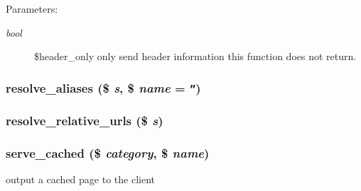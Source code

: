 \begin{Desc}
\item[Parameters:]
\begin{description}
\item[{\em bool}]\$header\_\-only only send header information this function does not return. \end{description}
\end{Desc}
\hypertarget{common_8inc_8php_78992fdfae6cd9d7d4e8053d004d1709}{
\subsubsection[{resolve\_\-aliases}]{\setlength{\rightskip}{0pt plus 5cm}resolve\_\-aliases (\$ {\em s}, \/  \$ {\em name} = {\tt ''})}}
\label{common_8inc_8php_78992fdfae6cd9d7d4e8053d004d1709}


\hypertarget{common_8inc_8php_81eb70073067db81ab43829870f15e6d}{
\subsubsection[{resolve\_\-relative\_\-urls}]{\setlength{\rightskip}{0pt plus 5cm}resolve\_\-relative\_\-urls (\$ {\em s})}}
\label{common_8inc_8php_81eb70073067db81ab43829870f15e6d}


\hypertarget{common_8inc_8php_ac90387dcab722e243df2d083f8d6a00}{
\subsubsection[{serve\_\-cached}]{\setlength{\rightskip}{0pt plus 5cm}serve\_\-cached (\$ {\em category}, \/  \$ {\em name})}}
\label{common_8inc_8php_ac90387dcab722e243df2d083f8d6a00}


output a cached page to the client

